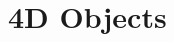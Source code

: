 \hypertarget{group___e_g_x_math-_geometry-4_d}{}\section{4D Objects}
\label{group___e_g_x_math-_geometry-4_d}
